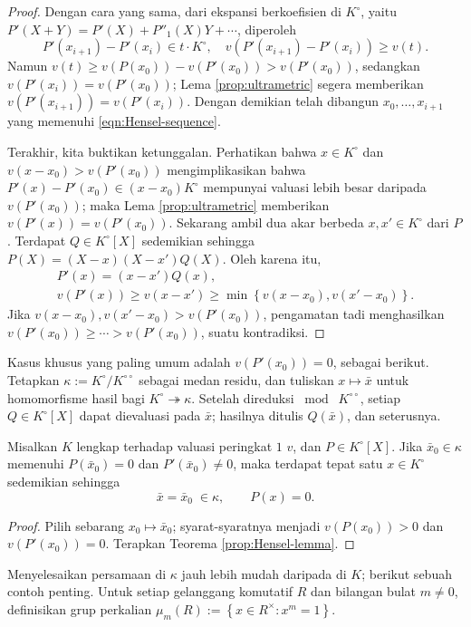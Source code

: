 \begin{proof}
	Dengan cara yang sama, dari ekspansi berkoefisien di $K^\circ$, yaitu $P'(X+Y) = P'(X) + P''_1(X) Y + \cdots$, diperoleh
	\[ P'(x_{i+1}) - P'(x_i) \in  t \cdot K^\circ, \quad v(P'(x_{i+1}) - P'(x_i)) \geq v(t). \]
	Namun $v(t) \geq v(P(x_0)) - v(P'(x_0)) > v(P'(x_0))$, sedangkan $v(P'(x_i)) = v(P'(x_0))$; Lema \ref{prop:ultrametric} segera memberikan $v(P'(x_{i+1})) = v(P'(x_i))$. Dengan demikian telah dibangun $x_0, \ldots, x_{i+1}$ yang memenuhi \eqref{eqn:Hensel-sequence}.

	Terakhir, kita buktikan ketunggalan. Perhatikan bahwa $x \in K^\circ$ dan $v(x-x_0) > v(P'(x_0))$ mengimplikasikan bahwa $P'(x) - P'(x_0) \in (x-x_0) K^\circ$ mempunyai valuasi lebih besar daripada $v(P'(x_0))$; maka Lema \ref{prop:ultrametric} memberikan $v(P'(x)) = v(P'(x_0))$. Sekarang ambil dua akar berbeda $x, x' \in K^\circ$ dari $P$. Terdapat $Q \in K^\circ[X]$ sedemikian sehingga $P(X) = (X-x)(X-x') Q(X)$. Oleh karena itu,
	\begin{gather*}
		P'(x) = (x-x')Q(x), \\
		v(P'(x)) \geq v(x-x') \geq \min\left\{ v(x - x_0), v(x' - x_0) \right\}.
	\end{gather*}
	Jika $v(x-x_0), v(x'-x_0) > v(P'(x_0))$, pengamatan tadi menghasilkan $v(P'(x_0)) \geq \cdots > v(P'(x_0))$, suatu kontradiksi.
\end{proof}

Kasus khusus yang paling umum adalah $v(P'(x_0))=0$, sebagai berikut. Tetapkan $\kappa := K^\circ/K^{\circ\circ}$ sebagai medan residu, dan tuliskan $x \mapsto \bar{x}$ untuk homomorfisme hasil bagi $K^\circ \twoheadrightarrow \kappa$. Setelah direduksi $\bmod \; K^{\circ\circ}$, setiap $Q \in K^\circ[X]$ dapat dievaluasi pada $\bar{x}$; hasilnya ditulis $Q(\bar{x})$, dan seterusnya.
\begin{corollary}\label{prop:Hensel-lemma-unique}
	Misalkan $K$ lengkap terhadap valuasi peringkat $1$ $v$, dan $P \in K^\circ[X]$. Jika $\bar{x}_0 \in \kappa$ memenuhi $P(\bar{x}_0) = 0$ dan $P'(\bar{x}_0) \neq 0$, maka terdapat tepat satu $x \in K^\circ$ sedemikian sehingga
	\[ \bar{x} = \bar{x}_0 \;\in \kappa, \qquad P(x)=0. \]
\end{corollary}
\begin{proof}
	Pilih sebarang $x_0 \mapsto \bar{x}_0$; syarat-syaratnya menjadi $v(P(x_0)) > 0$ dan $v(P'(x_0))=0$. Terapkan Teorema \ref{prop:Hensel-lemma}.
\end{proof}

Menyelesaikan persamaan di $\kappa$ jauh lebih mudah daripada di $K$; berikut sebuah contoh penting. Untuk setiap gelanggang komutatif $R$ dan bilangan bulat $m \neq 0$, definisikan grup perkalian $\mu_m(R) := \left\{ x \in R^\times: x^m = 1 \right\}$.

